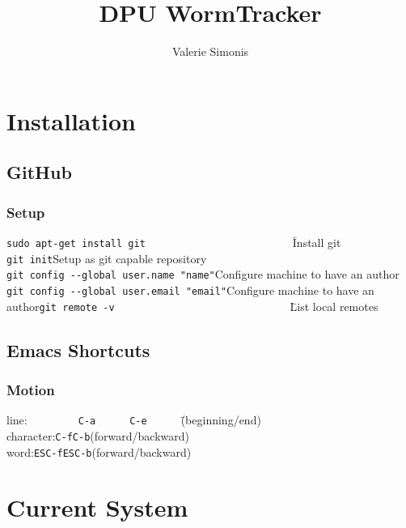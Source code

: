 \documentclass[fullpage]{report}
\begin{document}
 \title{DPU WormTracker}
 \author{Valerie Simonis}



\chapter{Installation}
\section{GitHub}
\subsection{Setup}
\begin{tabbing}
\verb|sudo apt-get install git|~~~~~~~~~~~~~~~~~~~~~~~~~~\=Install git \\
\verb|git init|\>Setup as git capable repository \\
\verb|git config --global user.name "name"|\>Configure machine to have an author\\
\verb|git config --global user.email "email"|\>Configure machine to have an author\verb|git remote -v|~~~~~~~~~~~~~~~~~~~~~~~~~~~~~~~\=List local remotes \\
\end{tabbing}


\section{Emacs Shortcuts}
\subsection{Motion}
\begin{tabbing}
line:~~~~~~~~~\=\verb|C-a|~~~~~~\=\verb|C-e|~~~~~~\=(beginning/end)\\
character:\>\verb|C-f|\>\verb|C-b|\>(forward/backward)\\
word:\>\verb|ESC-f|\>\verb|ESC-b|\>(forward/backward)\\
\end{tabbing} 


\chapter{Current System}
\end{document}
